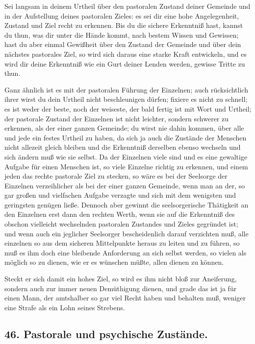 Sei langsam in deinem Urtheil über den pastoralen Zustand deiner Gemeinde und in der Aufstellung deines pastoralen Zieles: es sei dir eine hohe Angelegenheit, Zustand und Ziel recht zu erkennen. Bis du die sichere Erkenntniß hast,
kannst du thun, was dir unter die Hände kommt, nach bestem Wissen und Gewissen; hast du aber einmal Gewißheit über den Zustand der Gemeinde und über dein nächstes pastorales Ziel, so wird sich daraus eine starke Kraft entwickeln, und es wird dir deine Erkenntniß wie ein Gurt deiner Lenden werden, gewisse Tritte zu thun.

Ganz ähnlich ist es mit der pastoralen Führung der Einzelnen; auch rücksichtlich ihrer wirst du dein Urtheil nicht beschleunigen dürfen; fixiere es nicht zu schnell; es ist weder der beste, noch der weiseste, der bald fertig ist mit Wort und Urtheil; der pastorale Zustand der Einzelnen ist nicht leichter, sondern schwerer zu erkennen, als der einer ganzen Gemeinde; du wirst nie dahin kommen, über alle und jede ein festes Urtheil zu haben, da sich ja auch die Zustände der Menschen nicht allezeit gleich bleiben und die Erkenntniß derselben ebenso wechseln und sich ändern muß wie sie selbst. Da der Einzelnen viele sind und es eine gewaltige Aufgabe für einen Menschen ist, so viele Einzelne richtig zu erkennen, und einem jeden das rechte pastorale Ziel zu stecken, so wäre es bei der Seelsorge der Einzelnen verzeihlicher als bei der einer ganzen Gemeinde, wenn man an der, so gar großen und vielfachen Aufgabe verzagte und sich mit dem wenigsten und geringsten genügen ließe. Dennoch aber gewinnt die seelsorgerische Thätigkeit an den Einzelnen erst dann den rechten Werth, wenn sie auf die Erkenntniß des obschon vielleicht wechselnden pastoralen Zustandes und Zieles gegründet ist; und wenn auch ein jeglicher Seelsorger bescheidenlich darauf verzichten muß, alle
einzelnen so aus dem sicheren Mittelpunkte heraus zu leiten und zu führen, so muß es ihm doch eine bleibende Anforderung an sich selbst werden, so vielen als möglich so zu dienen, wie er es wünschen müßte, allen dienen zu können.

Steckt er sich damit ein hohes Ziel, so wird es ihm nicht bloß zur Aneiferung, sondern auch zur immer neuen Demüthigung dienen, und grade das ist ja für einen Mann, der amtshalber so gar viel Recht haben und behalten muß, weniger eine Strafe als ein Lohn seines Strebens.

\subsection*{46. Pastorale und psychische Zustände.}

